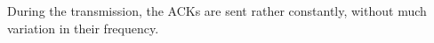 During the transmission, the ACKs are sent rather constantly, without much variation in their frequency.